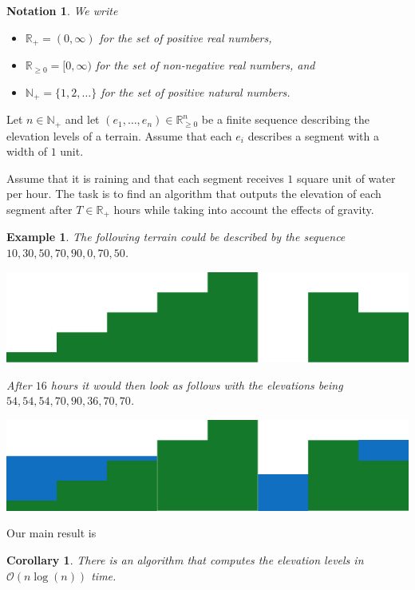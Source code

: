 \documentclass[11pt,a4paper]{article}
\newtheorem{ex}{Example}
\newtheorem{nota}{Notation}
\newtheorem{cor}{Corollary}
\newcommand{\Np}{\mathbb{N}_+}
\newcommand{\bO}{\mathcal{O}}
\newcommand{\Rp}{\mathbb{R}_+}
\newcommand{\Rnn}{\mathbb{R}_{\ge0}}
\begin{document}
\begin{nota}
  We write
  \begin{itemize}
    \item $\Rp = (0, \infty)$ for the set of positive real numbers,
    \item $\Rnn = [0, \infty)$ for the set of non-negative real numbers, and
    \item $\Np = \{ 1, 2, \ldots \}$ for the set of positive natural numbers.
  \end{itemize}
\end{nota}

Let $n\in\Np$ and let  $(e_1, \ldots, e_n) \in \Rnn^n$ be a finite sequence describing the elevation levels of a terrain.
Assume that each $e_i$ describes a segment with a width of $1$ unit.

Assume that it is raining and that each segment receives $1$ square unit of water per hour.
The task is to find an algorithm that outputs the elevation of each segment after $T\in\Rp$ hours while taking into account the effects of gravity.

\begin{ex}
  The following terrain could be described by the sequence $10, 30, 50, 70, 90, 0, 70, 50$.
  \begin{center}
    \includegraphics{im1.pdf}
  \end{center}
  After $16$ hours it would then look as follows with the elevations being $54, 54, 54, 70, 90, 36, 70, 70$.
  \begin{center}
    \includegraphics{im2.pdf}
  \end{center}
\end{ex}

Our main result is

\begin{cor}
\label{mainresult}
There is an algorithm that computes the elevation levels in $\bO(n\log(n))$ time.
\end{cor}
\end{document}
